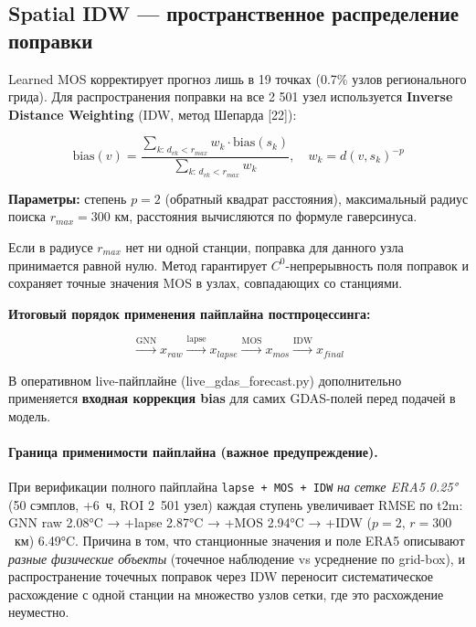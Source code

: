 \documentclass[14pt,a4paper]{extarticle}
\numberwithin{table}{section}
\numberwithin{figure}{section}
\numberwithin{equation}{section}
\begin{document}
\subsection{Spatial IDW --- пространственное распределение поправки}\label{spatial-idw-ux43fux440ux43eux441ux442ux440ux430ux43dux441ux442ux432ux435ux43dux43dux43eux435-ux440ux430ux441ux43fux440ux435ux434ux435ux43bux435ux43dux438ux435-ux43fux43eux43fux440ux430ux432ux43aux438}

Learned MOS корректирует прогноз лишь в 19 точках (0.7\% узлов
регионального грида). Для распространения поправки на все 2 501 узел
используется \textbf{Inverse Distance Weighting} (IDW, метод Шепарда
{[}22{]}):

\[\text{bias}(v) = \frac{\displaystyle\sum_{k:\, d_{vk} < r_{max}} w_k \cdot \text{bias}(s_k)}{\displaystyle\sum_{k:\, d_{vk} < r_{max}} w_k}, \quad w_k = d(v, s_k)^{-p}\]

\textbf{Параметры:} степень \(p = 2\) (обратный квадрат расстояния),
максимальный радиус поиска \(r_{max} = 300\) км, расстояния вычисляются
по формуле гаверсинуса.

Если в радиусе \(r_{max}\) нет ни одной станции, поправка для данного
узла принимается равной нулю. Метод гарантирует \(C^0\)-непрерывность
поля поправок и сохраняет точные значения MOS в узлах, совпадающих со
станциями.

\textbf{Итоговый порядок применения пайплайна постпроцессинга:}

\[\xrightarrow{\text{GNN}} x_{raw} \xrightarrow{\text{lapse}} x_{lapse} \xrightarrow{\text{MOS}} x_{mos} \xrightarrow{\text{IDW}} x_{final}\]

В оперативном live-пайплайне (live\_gdas\_forecast.py) дополнительно
применяется \textbf{входная коррекция bias} для самих GDAS-полей перед
подачей в модель.

\paragraph{Граница применимости пайплайна (важное предупреждение).}
При верификации полного пайплайна
\texttt{lapse + MOS + IDW} \emph{на сетке ERA5 0.25°} (50 сэмплов,
+6~ч, ROI 2~501 узел) каждая ступень увеличивает RMSE по t2m:
GNN raw 2.08°C → +lapse 2.87°C → +MOS 2.94°C → +IDW (\(p=2\), \(r=300\)~км)
6.49°C. Причина в том, что станционные значения и поле ERA5 описывают
\emph{разные физические объекты} (точечное наблюдение vs усреднение
по grid-box), и распространение точечных поправок через IDW переносит
систематическое расхождение с одной станции на множество узлов сетки,
где это расхождение неуместно.
\end{document}
